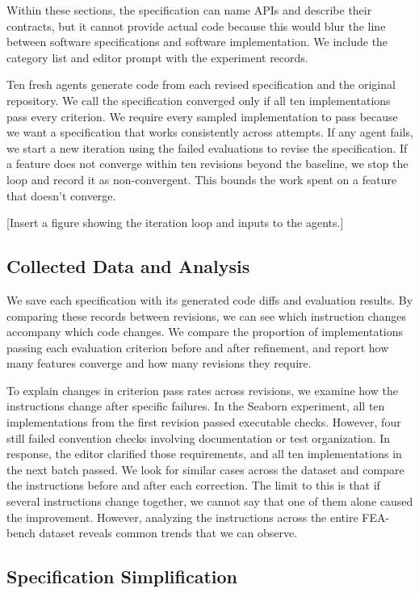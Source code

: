 \documentclass[sigconf,nonacm]{acmart}
\begin{document}
Within these sections, the specification can name APIs and describe their contracts, but it cannot provide actual code because this would blur the line between software specifications and software implementation. We include the category list and editor prompt with the experiment records.

Ten fresh agents generate code from each revised specification and the original repository. We call the specification converged only if all ten implementations pass every criterion. We require every sampled implementation to pass because we want a specification that works consistently across attempts. If any agent fails, we start a new iteration using the failed evaluations to revise the specification. If a feature does not converge within ten revisions beyond the baseline, we stop the loop and record it as non-convergent. This bounds the work spent on a feature that doesn't converge.

[Insert a figure showing the iteration loop and inputs to the agents.]

\subsection{Collected Data and Analysis}

We save each specification with its generated code diffs and evaluation results. By comparing these records between revisions, we can see which instruction changes accompany which code changes. We compare the proportion of implementations passing each evaluation criterion before and after refinement, and report how many features converge and how many revisions they require.

To explain changes in criterion pass rates across revisions, we examine how the instructions change after specific failures. In the Seaborn experiment, all ten implementations from the first revision passed executable checks. However, four still failed convention checks involving documentation or test organization. In response, the editor clarified those requirements, and all ten implementations in the next batch passed. We look for similar cases across the dataset and compare the instructions before and after each correction. The limit to this is that if several instructions change together, we cannot say that one of them alone caused the improvement. However, analyzing the instructions across the entire FEA-bench dataset reveals common trends that we can observe.

\subsection{Specification Simplification}
\end{document}
